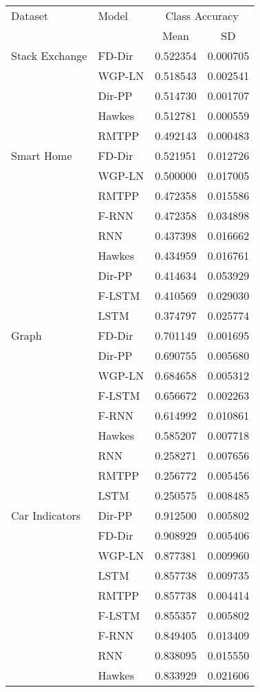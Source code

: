 \begin{tabular}{llcc}
\toprule
Dataset & Model & \multicolumn{2}{c}{Class Accuracy} \\
 &  &  Mean & SD \\
\midrule
 Stack Exchange &  FD-Dir &   0.522354 &  0.000705 \\
  &  WGP-LN &   0.518543 &  0.002541 \\
  &  Dir-PP &   0.514730 &  0.001707 \\
  &  Hawkes &   0.512781 &  0.000559 \\
  &   RMTPP &   0.492143 &  0.000483 \\
 \midrule
 Smart Home &  FD-Dir &   0.521951 &  0.012726 \\
 &  WGP-LN &   0.500000 &  0.017005 \\
 &   RMTPP &   0.472358 &  0.015586 \\
 &   F-RNN &   0.472358 &  0.034898 \\
 &     RNN &   0.437398 &  0.016662 \\
 &  Hawkes &   0.434959 &  0.016761 \\
 &  Dir-PP &   0.414634 &  0.053929 \\
 &  F-LSTM &   0.410569 &  0.029030 \\
 &    LSTM &   0.374797 &  0.025774 \\
\midrule
        Graph &  FD-Dir &   0.701149 &  0.001695 \\
 &  Dir-PP &   0.690755 &  0.005680 \\
 &  WGP-LN &   0.684658 &  0.005312 \\
 &  F-LSTM &   0.656672 &  0.002263 \\
 &   F-RNN &   0.614992 &  0.010861 \\
 &  Hawkes &   0.585207 &  0.007718 \\
 &     RNN &   0.258271 &  0.007656 \\
 &   RMTPP &   0.256772 &  0.005456 \\
 &    LSTM &   0.250575 &  0.008485 \\
\midrule
Car Indicators &  Dir-PP &   0.912500 &  0.005802 \\
 &  FD-Dir &   0.908929 &  0.005406 \\
 &  WGP-LN &   0.877381 &  0.009960 \\
 &    LSTM &   0.857738 &  0.009735 \\
 &   RMTPP &   0.857738 &  0.004414 \\
 &  F-LSTM &   0.855357 &  0.005802 \\
 &   F-RNN &   0.849405 &  0.013409 \\
 &     RNN &   0.838095 &  0.015550 \\
 &  Hawkes &   0.833929 &  0.021606 \\
\bottomrule
\end{tabular}
